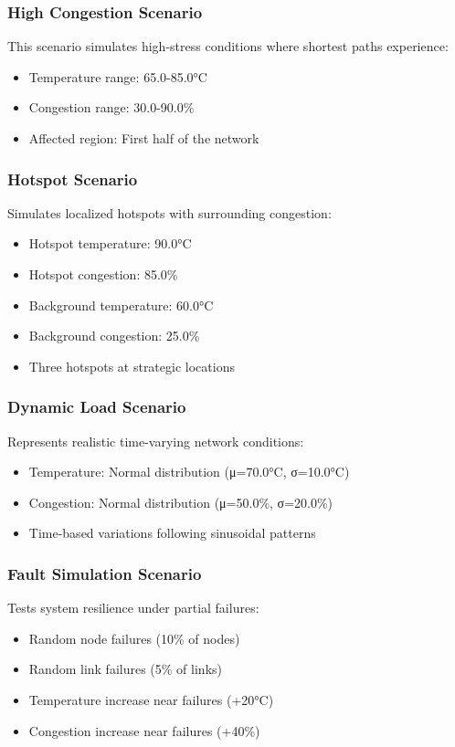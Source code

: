 \documentclass[12pt]{article}
\begin{document}
\subsubsection{High Congestion Scenario}
This scenario simulates high-stress conditions where shortest paths experience:
\begin{itemize}
    \item Temperature range: 65.0-85.0°C
    \item Congestion range: 30.0-90.0\%
    \item Affected region: First half of the network
\end{itemize}

\subsubsection{Hotspot Scenario}
Simulates localized hotspots with surrounding congestion:
\begin{itemize}
    \item Hotspot temperature: 90.0°C
    \item Hotspot congestion: 85.0\%
    \item Background temperature: 60.0°C
    \item Background congestion: 25.0\%
    \item Three hotspots at strategic locations
\end{itemize}

\subsubsection{Dynamic Load Scenario}
Represents realistic time-varying network conditions:
\begin{itemize}
    \item Temperature: Normal distribution (μ=70.0°C, σ=10.0°C)
    \item Congestion: Normal distribution (μ=50.0\%, σ=20.0\%)
    \item Time-based variations following sinusoidal patterns
\end{itemize}

\subsubsection{Fault Simulation Scenario}
Tests system resilience under partial failures:
\begin{itemize}
    \item Random node failures (10\% of nodes)
    \item Random link failures (5\% of links)
    \item Temperature increase near failures (+20°C)
    \item Congestion increase near failures (+40\%)
\end{itemize}
\end{document}
